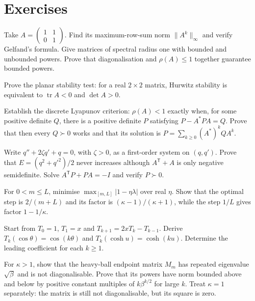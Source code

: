 \section{Exercises}

\begin{exercise}[$\star$]\label{linear:ex:gelfandex}
Take $A=\left(\begin{smallmatrix}1&1\\0&1\end{smallmatrix}\right)$. Find its maximum-row-sum norm $\|A^k\|_\infty$ and verify Gelfand's formula. Give matrices of spectral radius one with bounded and unbounded powers. Prove that diagonalisation and $\rho(A)\le1$ together guarantee bounded powers.
\end{exercise}
\begin{exercise}[$\star$]\label{linear:ex:hurwitz2}
Prove the planar stability test: for a real $2\times2$ matrix, Hurwitz stability is equivalent to $\operatorname{tr}A<0$ and $\det A>0$.
\end{exercise}
\begin{exercise}[$\star\star$]\label{linear:ex:stein}
Establish the discrete Lyapunov criterion: $\rho(A)<1$ exactly when, for some positive definite $Q$, there is a positive definite $P$ satisfying $P-A^*PA=Q$. Prove that then every $Q\succ0$ works and that its solution is $P=\sum_{k\ge0}(A^*)^kQA^k$.
\end{exercise}
\begin{exercise}[$\star$]\label{linear:ex:oscillator}
Write $q''+2\zeta q'+q=0$, with $\zeta>0$, as a first-order system on $(q,q')$. Prove that $E=(q^2+q'^2)/2$ never increases although $A^{\mathsf T}+A$ is only negative semidefinite. Solve $A^{\mathsf T}P+PA=-I$ and verify $P\succ0$.
\end{exercise}
\begin{exercise}[$\star$]\label{linear:ex:gdstep}
For $0<m\le L$, minimise $\max_{[m,L]}|1-\eta\lambda|$ over real $\eta$. Show that the optimal step is $2/(m+L)$ and its factor is $(\kappa-1)/(\kappa+1)$, while the step $1/L$ gives factor $1-1/\kappa$.
\end{exercise}
\begin{exercise}[$\star\star$]\label{linear:ex:chebyshevrec}
Start from $T_0=1$, $T_1=x$ and $T_{k+1}=2xT_k-T_{k-1}$. Derive $T_k(\cos\theta)=\cos(k\theta)$ and $T_k(\cosh u)=\cosh(ku)$. Determine the leading coefficient for each $k\ge1$.
\end{exercise}
\begin{exercise}[$\star\star$]\label{linear:ex:heavyjordan}
For $\kappa>1$, show that the heavy-ball endpoint matrix $M_m$ has repeated eigenvalue $\sqrt\beta$ and is not diagonalisable. Prove that its powers have norm bounded above and below by positive constant multiples of $k\beta^{k/2}$ for large $k$. Treat $\kappa=1$ separately: the matrix is still not diagonalisable, but its square is zero.
\end{exercise}
